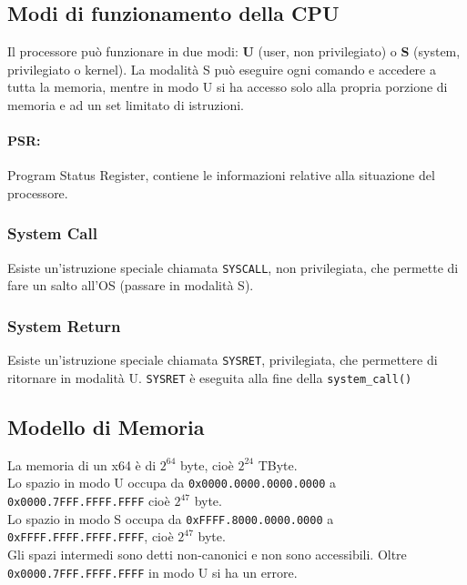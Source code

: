 \documentclass[10pt,a4paper]{article}
\newcommand{\code}{\texttt}
\begin{document}
\subsection{Modi di funzionamento della CPU}
Il processore può funzionare in due modi: \textbf{U} (user, non privilegiato) o \textbf{S} (system, privilegiato o kernel).
La modalità S può eseguire ogni comando e accedere a tutta la memoria, mentre in modo U si ha accesso solo alla propria porzione di memoria e ad un set limitato di istruzioni.
\paragraph{PSR:} Program Status Register, contiene le informazioni relative alla situazione del processore.

\subsubsection{System Call}
Esiste un'istruzione speciale chiamata \code{SYSCALL}, non privilegiata, che permette di fare un salto all'OS (passare in modalità S).

\subsubsection{System Return}
Esiste un'istruzione speciale chiamata \code{SYSRET}, privilegiata, che permettere di ritornare in modalità U.
\code{SYSRET} è eseguita alla fine della \code{system\_call()}

\subsection{Modello di Memoria}
La memoria di un x64 è di $2^{64}$ byte, cioè $2^{24}$ TByte.\\
Lo spazio in modo U occupa da \code{0x0000.0000.0000.0000} a \code{0x0000.7FFF.FFFF.FFFF} cioè $2^{47}$ byte.\\
Lo spazio in modo S occupa da \code{0xFFFF.8000.0000.0000} a \code{0xFFFF.FFFF.FFFF.FFFF}, cioè $2^{47}$ byte.\\
Gli spazi intermedi sono detti non-canonici e non sono accessibili. Oltre \code{0x0000.7FFF.FFFF.FFFF} in modo U si ha un errore.
\end{document}
